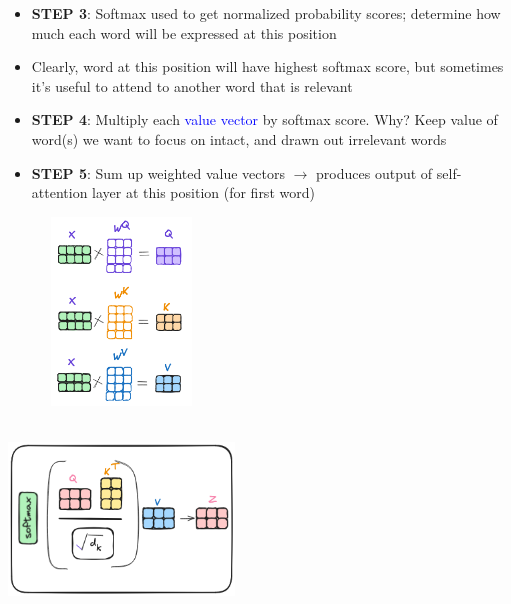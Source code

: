 \documentclass{article}
\begin{document}
\begin{minipage}{0.5\textwidth}
\begin{itemize}
    \item \textbf{STEP 3}: Softmax used to get normalized probability scores; determine how much each word will be expressed at this position
    \item Clearly, word at this position will have highest softmax score, but sometimes it's useful to attend to another word that is relevant
    \item \textbf{STEP 4}: Multiply each \textcolor{blue}{value vector} by softmax score. Why? Keep value of word(s) we want to focus on intact, and drawn out irrelevant words
    \item \textbf{STEP 5}: Sum up weighted value vectors $\rightarrow$  produces output of self-attention layer at this position (for first word)
\end{itemize}
\end{minipage}
\begin{minipage}{0.5\textwidth}
\includegraphics[width=6cm, height=5cm]{Transformer/Images/SelfAttention4.png}
\end{minipage}
\begin{minipage}{0.5\textwidth}
\includegraphics[width=6cm, height=5cm]{Transformer/Images/SelfAttention5.png}
\end{minipage}
\end{document}
